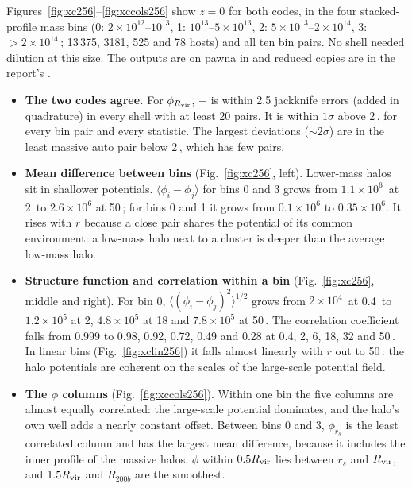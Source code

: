 Figures~\ref{fig:xc256}--\ref{fig:xccols256} show $z=0$ for both codes, in the four stacked-profile mass bins
(0: $2\times10^{12}$--$10^{13}$, 1: $10^{13}$--$5\times10^{13}$, 2: $5\times10^{13}$--$2\times10^{14}$,
3: $>2\times10^{14}$\,\Msunh; 13\,375, 3181, 525 and 78 \gad{} hosts) and all ten bin pairs. No shell needed
dilution at this size. The outputs are on pawna in  and reduced
copies are in the report's .
\begin{itemize}
\item \textbf{The two codes agree.} For $\phi_{R_{\rm vir}}$, \pkd{} $-$ \gad{} is within 2.5 jackknife errors
(added in quadrature) in every shell with at least 20 pairs. It is within $1\sigma$ above 2\,\Mpch, for every bin
pair and every statistic. The largest deviations ($\sim2\sigma$) are in the least massive auto pair below 2\,\Mpch{},
which has few pairs.
\item \textbf{Mean difference between bins} (Fig.~\ref{fig:xc256}, left). Lower-mass halos sit in shallower
potentials. $\langle\phi_i-\phi_j\rangle$ for bins 0 and 3 grows from $1.1\times10^6$\,\kms{} at 2\,\Mpch{} to
$2.6\times10^6$ at 50\,\Mpch; for bins 0 and 1 it grows from $0.1\times10^6$ to $0.35\times10^6$. It rises with $r$
because a close pair shares the potential of its common environment: a low-mass halo next to a cluster is deeper
than the average low-mass halo.
\item \textbf{Structure function and correlation within a bin} (Fig.~\ref{fig:xc256}, middle and right). For bin 0,
$\langle(\phi_i-\phi_j)^2\rangle^{1/2}$ grows from $2\times10^4$\,\kms{} at 0.4\,\Mpch{} to $1.2\times10^5$ at 2,
$4.8\times10^5$ at 18 and $7.8\times10^5$ at 50\,\Mpch. The correlation coefficient falls from 0.999 to 0.98, 0.92,
0.72, 0.49 and 0.28 at 0.4, 2, 6, 18, 32 and 50\,\Mpch. In linear bins (Fig.~\ref{fig:xclin256}) it falls almost
linearly with $r$ out to 50\,\Mpch: the halo potentials are coherent on the scales of the large-scale potential
field.
\item \textbf{The $\phi$ columns} (Fig.~\ref{fig:xccols256}). Within one bin the five columns are almost equally
correlated: the large-scale potential dominates, and the halo's own well adds a nearly constant offset. Between
bins 0 and 3, $\phi_{r_s}$ is the least correlated column and has the largest mean difference, because it includes
the inner profile of the massive halos. $\phi$ within $0.5R_{\rm vir}$ lies between $r_s$ and $R_{\rm vir}$, and
$1.5R_{\rm vir}$ and $R_{200b}$ are the smoothest.
\end{itemize}

